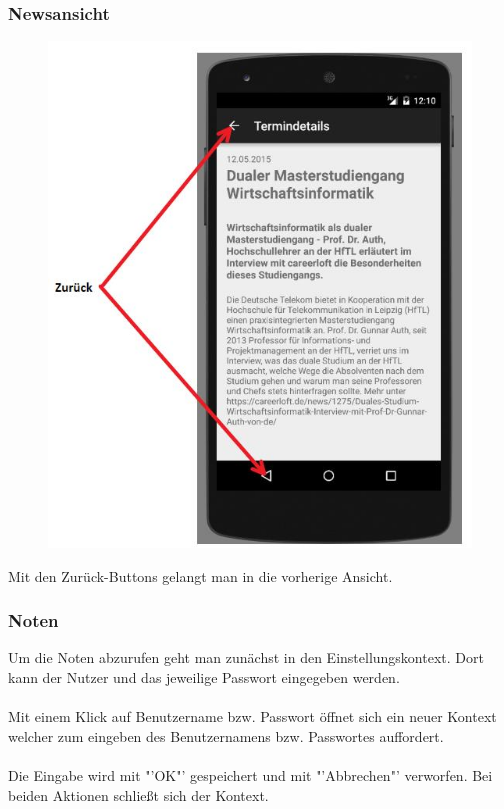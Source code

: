 \subsubsection{Newsansicht}
\begin{figure}[h]
	\centering
	\includegraphics[scale=0.8]{03_Bedienungsanleitung/img/news.jpg}
	\label{img:grafik-dummy}
\end{figure}

Mit den Zurück-Buttons gelangt man in die vorherige Ansicht.

\newpage
\subsubsection{Noten}

Um die Noten abzurufen geht man zunächst in den Einstellungskontext. Dort kann der Nutzer und das jeweilige Passwort eingegeben werden.
\\
\\
Mit einem Klick auf Benutzername bzw. Passwort öffnet sich ein neuer Kontext welcher zum eingeben des Benutzernamens bzw. Passwortes auffordert.
\\
\\
Die Eingabe wird mit "'OK"' gespeichert und mit "'Abbrechen"' verworfen. Bei beiden Aktionen schließt sich der Kontext.

